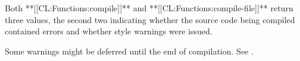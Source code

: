Both **[[CL:Functions:compile]]** and **[[CL:Functions:compile-file]]** return three
values, the second two indicating whether the source code being compiled
contained errors and whether style warnings were issued.
 

 
Some warnings might be deferred until the end of compilation. 
See .









\endsubSection%





